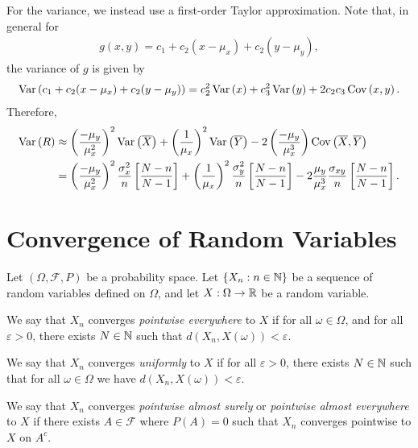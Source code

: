 \begin{exmp}
    For the variance, we instead use a first-order Taylor approximation. Note that, in general for
    \begin{align*}
        g(x,y) = c_1 + c_2(x - \mu_x) + c_2(y - \mu_y),
    \end{align*}
    the variance of $g$ is given by
    \begin{align*}
        \operatorname{Var}\left(c_1 + c_2(x - \mu_x) + c_2(y - \mu_y)\right) = c_2^2\operatorname{Var}\left(x\right) + c_3^2\operatorname{Var}\left(y\right)  + 2c_2c_3\operatorname{Cov}\left(x, y\right).
    \end{align*}
    Therefore,
    \begin{align*}
        \operatorname{Var}\left(R\right) &\approx \left(\frac{-\mu_y}{\mu_x^2}\right)^2\operatorname{Var}\left(\overline{X}\right) + \left(\frac{1}{\mu_x}\right)^2\operatorname{Var}\left(\overline{Y}\right) - 2\left(\frac{-\mu_y}{\mu_x^3}\right)\operatorname{Cov}\left(\overline{X}, \overline{Y}\right) \\
        &= \left(\frac{-\mu_y}{\mu_x^2}\right)^2\frac{\sigma_{x}^2}{n}\left[\frac{N-n}{N-1}\right] + \left(\frac{1}{\mu_x}\right)^2\frac{\sigma_{y}^2}{n}\left[\frac{N-n}{N-1}\right] - 2\frac{\mu_y}{\mu_x^3}\frac{\sigma_{xy}}{n}\left[\frac{N-n}{N-1}\right].
    \end{align*}
\end{exmp}

\section{Convergence of Random Variables}

\begin{defn}
    Let $(\Omega, \mathcal{F}, P)$ be a probability space. Let $\{X_n : n \in \mathbb{N}\}$ be a sequence of random variables defined on $\Omega$, and let $X: \Omega \to \mathbb{R}$ be a random variable.

    We say that $X_n$ converges \emph{pointwise everywhere} to $X$ if for all $\omega \in \Omega$, and for all $\varepsilon > 0$, there exists $N \in \mathbb{N}$ such that $d\left(X_n, X(\omega)\right) < \varepsilon$.

    We say that $X_n$ converges \emph{uniformly} to $X$ if for all $\varepsilon > 0$, there exists $N \in \mathbb{N}$ such that for all 
    $\omega \in \Omega$ we have $d\left(X_n, X(\omega)\right) < \varepsilon$.

    We say that $X_n$ converges \emph{pointwise almost surely} or \emph{pointwise almost everywhere} to $X$ if there exists $
    A \in \mathcal{F}$ where $P(A) = 0$ such that $X_n$ converges pointwise to $X$ on $A^{c}$.
\end{defn}

